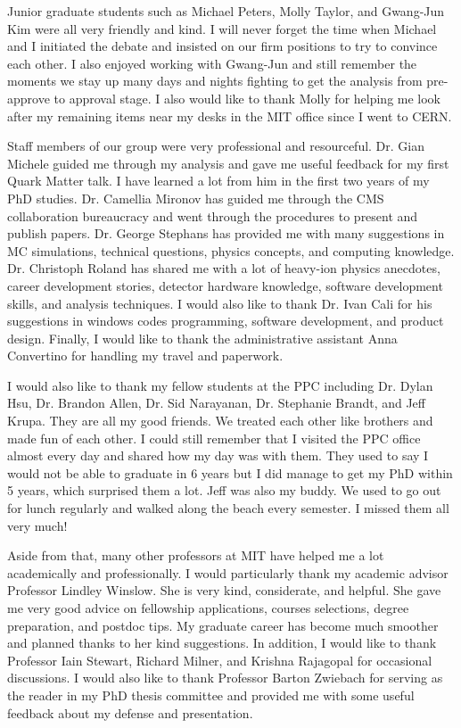 Junior graduate students such as Michael Peters, Molly Taylor, and Gwang-Jun Kim were all very friendly and kind. I will never forget the time when Michael and I initiated the debate and insisted on our firm positions to try to convince each other. I also enjoyed working with Gwang-Jun and still remember the moments we stay up many days and nights fighting to get the analysis from pre-approve to approval stage. I also would like to thank Molly for helping me look after my remaining items near my desks in the MIT office since I went to CERN. 


Staff members of our group were very professional and resourceful. Dr. Gian Michele guided me through my analysis and gave me useful feedback for my first Quark Matter talk. I have learned a lot from him in the first two years of my PhD studies. Dr. Camellia Mironov has guided me through the CMS collaboration bureaucracy and went through the procedures to present and publish papers. Dr. George Stephans has provided me with many suggestions in MC simulations, technical questions, physics concepts, and computing knowledge. Dr. Christoph Roland has shared me with a lot of heavy-ion physics anecdotes, career development stories, detector hardware knowledge, software development skills, and analysis techniques. I would also like to thank Dr. Ivan Cali for his suggestions in windows codes programming, software development, and product design. Finally, I would like to thank the administrative assistant Anna Convertino for handling my travel and paperwork.  


I would also like to thank my fellow students at the PPC including Dr. Dylan Hsu, Dr. Brandon Allen, Dr. Sid Narayanan, Dr. Stephanie Brandt, and Jeff Krupa. They are all my good friends. We treated each other like brothers and made fun of each other. I could still remember that I visited the PPC office almost every day and shared how my day was with them. They used to say I would not be able to graduate in 6 years but I did manage to get my PhD within 5 years, which surprised them a lot. Jeff was also my buddy. We used to go out for lunch regularly and walked along the beach every semester. I missed them all very much!

Aside from that, many other professors at MIT have helped me a lot academically and professionally. I would particularly thank my academic advisor Professor Lindley Winslow. She is very kind, considerate, and helpful. She gave me very good advice on fellowship applications, courses selections, degree preparation, and postdoc tips. My graduate career has become much smoother and planned thanks to her kind suggestions. In addition, I would like to thank Professor Iain Stewart, Richard Milner, and Krishna Rajagopal for occasional discussions. I would also like to thank Professor Barton Zwiebach for serving as the reader in my PhD thesis committee and provided me with some useful feedback about my defense and presentation.

